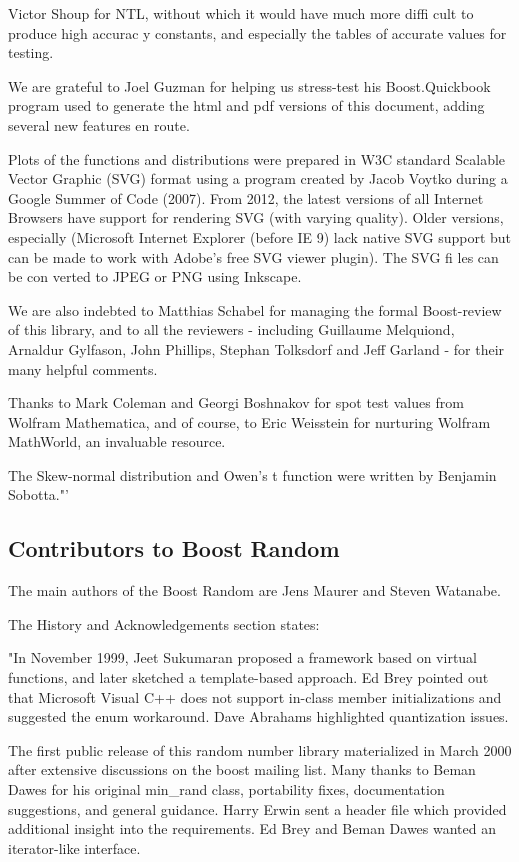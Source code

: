 \vpara
Victor Shoup for NTL, without which it would have much more diffi cult to produce high accurac y constants, and especially the tables of accurate values for testing.

\vpara
We are grateful to Joel Guzman for helping us stress-test his Boost.Quickbook program used to generate the html and pdf versions of this document, adding several new features en route.

\vpara
Plots of the functions and distributions were prepared in W3C standard Scalable Vector Graphic (SVG) format using a program created by Jacob Voytko during a Google Summer of Code (2007). From 2012, the latest versions of all Internet Browsers have support for rendering SVG (with varying quality). Older versions, especially (Microsoft Internet Explorer (before IE 9) lack native SVG support but can be made to work with Adobe's free SVG viewer plugin). The SVG fi les can be con verted to JPEG or PNG using Inkscape.

\vpara
We are also indebted to Matthias Schabel for managing the formal Boost-review of this library, and to all the reviewers - including Guillaume Melquiond, Arnaldur Gylfason, John Phillips, Stephan Tolksdorf and Jeff Garland - for their many helpful comments.

\vpara
Thanks to Mark Coleman and Georgi Boshnakov for spot test values from Wolfram Mathematica, and of course, to Eric Weisstein for nurturing Wolfram MathWorld, an invaluable resource.

\vpara
The Skew-normal distribution and Owen's t function were written by Benjamin Sobotta."'




\subsection{Contributors to Boost Random}
\label{Contributors to Boost Random}
The main authors of the Boost Random are Jens Maurer and Steven Watanabe.

\vpara
The History and Acknowledgements section states:

\vpara
"In November 1999, Jeet Sukumaran proposed a framework based on virtual functions, and later sketched a template-based approach. Ed Brey pointed out that Microsoft Visual C++ does not support in-class member initializations and suggested the enum workaround. Dave Abrahams highlighted quantization issues. 

\vpara
The first public release of this random number library materialized in March 2000 after extensive discussions on the boost mailing list. Many thanks to Beman Dawes for his original min\_rand class, portability fixes, documentation suggestions, and general guidance. Harry Erwin sent a header file which provided additional insight into the requirements. Ed Brey and Beman Dawes wanted an iterator-like interface. 

